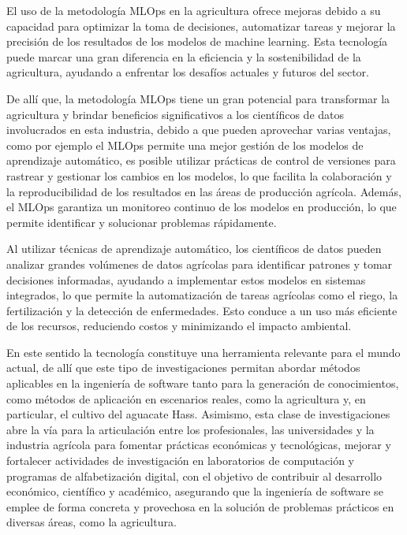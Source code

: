 \newpage

El uso de la metodología MLOps en la agricultura ofrece mejoras debido a su capacidad para optimizar la toma de decisiones, automatizar tareas y mejorar la precisión de los resultados de los modelos de machine learning. Esta tecnología puede marcar una gran diferencia en la eficiencia y la sostenibilidad de la agricultura, ayudando a enfrentar los desafíos actuales y futuros del sector.

De allí que, la metodología MLOps tiene un gran potencial para transformar la agricultura y brindar beneficios significativos a los científicos de datos involucrados en esta industria, debido a que pueden aprovechar varias ventajas, como por ejemplo el MLOps permite una mejor gestión de los modelos de aprendizaje automático, es posible utilizar prácticas de control de versiones para rastrear y gestionar los cambios en los modelos, lo que facilita la colaboración y la reproducibilidad de los resultados en las áreas de producción agrícola. Además, el MLOps garantiza un monitoreo continuo de los modelos en producción, lo que permite identificar y solucionar problemas rápidamente.

Al utilizar técnicas de aprendizaje automático, los científicos de datos pueden analizar grandes volúmenes de datos agrícolas para identificar patrones y tomar decisiones informadas, ayudando a implementar estos modelos en sistemas integrados, lo que permite la automatización de tareas agrícolas como el riego, la fertilización y la detección de enfermedades. Esto conduce a un uso más eficiente de los recursos, reduciendo costos y minimizando el impacto ambiental.

En este sentido la tecnología constituye una herramienta relevante para el mundo actual, de allí que este tipo de investigaciones permitan abordar métodos aplicables en la ingeniería de software tanto para la generación de conocimientos, como métodos de aplicación en escenarios reales, como la agricultura y, en particular, el cultivo del aguacate Hass. Asimismo, esta clase de investigaciones abre la vía para la articulación entre los profesionales, las universidades y la industria agrícola para fomentar prácticas económicas y tecnológicas, mejorar y fortalecer actividades de investigación en laboratorios de computación y programas de alfabetización digital, con el objetivo de contribuir al desarrollo económico, científico y académico, asegurando que la ingeniería de software se emplee de forma concreta y provechosa en la solución de problemas prácticos en diversas áreas, como la agricultura.